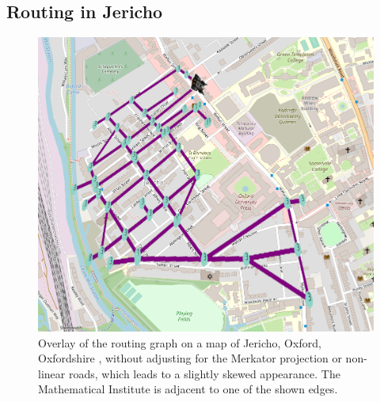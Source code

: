\documentclass{prettytex/ox/mmsc-special-topic}
\begin{document}
  \subsection{Routing in Jericho}
  \begin{figure}[H]
    \centering
    \includegraphics[width=0.45\linewidth]{figures/jericho.png}
    \caption{Overlay of the routing graph on a map of Jericho, Oxford, Oxfordshire \parencite{osm}, without adjusting for the Merkator projection or non-linear roads, which leads to a slightly skewed appearance. The Mathematical Institute is adjacent to one of the shown edges.}
    \label{fig:jericho}
  \end{figure}
\end{document}
